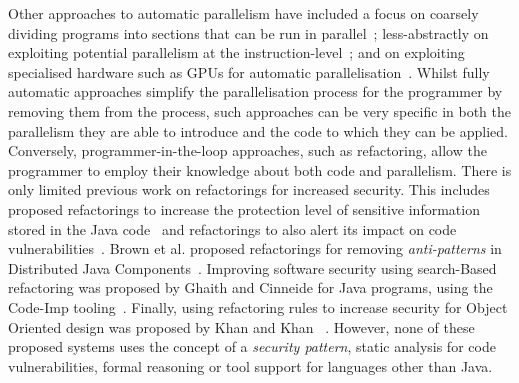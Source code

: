 \documentclass[a4paper,11pt]{article}
\begin{document}
%
%
Other approaches to automatic parallelism have included a focus on coarsely dividing programs into sections that can be run in parallel~\cite{DBLP:conf/pepm/LiT15,DBLP:conf/ppopp/RulVB08}; less-abstractly on exploiting potential parallelism at the instruction-level~\cite{DBLP:conf/europar/StefanovicM00}; and on exploiting specialised hardware such as GPUs for automatic parallelisation~\cite{DBLP:conf/popl/GuoTS11,DBLP:conf/pppj/LeungLL09}.
% 
%
Whilst fully automatic approaches simplify the parallelisation process for the programmer by removing them from the process, such approaches can be very specific in both the parallelism they are able to introduce and the code to which they can be applied. Conversely, programmer-in-the-loop approaches, such as refactoring, allow the programmer to employ their knowledge about both code and parallelism.
%
There is only limited previous work on refactorings for increased security. This includes proposed refactorings to increase the protection level of sensitive information stored in the Java code~\cite{maru2007} and refactorings to also alert its impact on code vulnerabilities~\cite{maru2008}.
Brown et al. proposed refactorings for removing \emph{anti-patterns} in Distributed Java Components~\cite{brown1998antipatterns}.  Improving software security using search-Based refactoring was proposed by Ghaith and Cinneide for Java programs, using the Code-Imp tooling~\cite{ghaith}. Finally, using refactoring rules to increase security for Object Oriented design was proposed by Khan and Khan~\cite{khan} . However, none of these proposed systems uses the concept of a \emph{security pattern}, static analysis for code vulnerabilities, formal reasoning or tool support for languages other than Java. 
 
\end{document}
